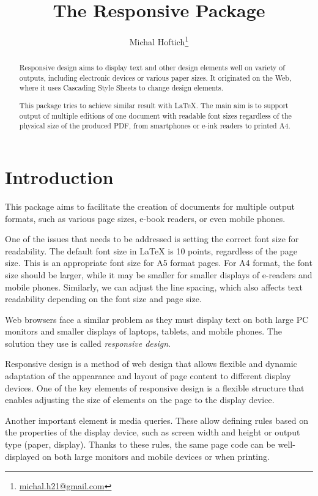 \documentclass{ltxdoc}
\title{The Responsive Package}
\author{Michal Hoftich\thanks{\url{michal.h21@gmail.com}}}
\begin{document}
\maketitle
\begin{abstract}
Responsive design aims to display text and other design elements well on
variety of outputs, including electronic devices or various paper sizes.
It originated on the Web, where it uses Cascading Style Sheets to change 
design elements. 

This package tries to achieve similar result with \LaTeX. The main aim is to 
support output of multiple editions of one document with 
readable font sizes regardless of the physical size of the produced PDF,
from smartphones or e-ink readers to printed A4.
\end{abstract}
\tableofcontents

\section{Introduction}

This package aims to facilitate the creation of documents for multiple output
formats, such as various page sizes, e-book readers, or even mobile phones.

One of the issues that needs to be addressed is setting the correct font size
for readability. The default font size in LaTeX is 10 points, regardless of the
page size. This is an appropriate font size for A5 format pages. For A4 format,
the font size should be larger, while it may be smaller for smaller displays of
e-readers and mobile phones. Similarly, we can adjust the line spacing, which
also affects text readability depending on the font size and page size.

Web browsers face a similar problem as they must display text on both large PC
monitors and smaller displays of laptops, tablets, and mobile phones. The
solution they use is called \textit{responsive design}.

Responsive design is a method of web design that allows flexible and dynamic
adaptation of the appearance and layout of page content to different display
devices. One of the key elements of responsive design is a flexible structure
that enables adjusting the size of elements on the page to the display device.

Another important element is media queries. These allow defining rules based on
the properties of the display device, such as screen width and height or output
type (paper, display). Thanks to these rules, the same page code can be
well-displayed on both large monitors and mobile devices or when printing. 
\end{document}
